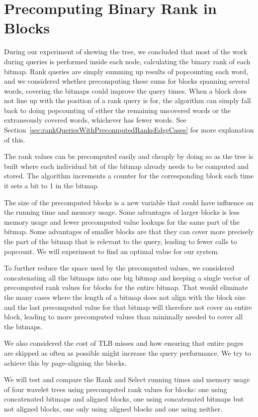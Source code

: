 \section{Precomputing Binary Rank in Blocks}
During our experiment of skewing the tree, we concluded that most of the work during queries is performed inside each node, calculating the binary rank of each bitmap.
Rank queries are simply summing up results of popcounting each word, and we considered whether precomputing these sums for blocks spanning several words, covering the bitmaps could improve the query times.
When a block does not line up with the position of a rank query is for, the algorithm can simply fall back to doing popcounting of either the remaining uncovered words or the extraneously covered words, whichever has fewer words.
See Section~\ref{sec:rankQueriesWithPrecomputedRanksEdgeCases} for more explanation of this.

The rank values can be precomputed easily and cheaply by doing so as the tree is built where each individual bit of the bitmap already needs to be computed and stored.
The algorithm increments a counter for the corresponding block each time it sets a bit to 1 in the bitmap.

The size of the precomputed blocks is a new variable that could have influence on the running time and memory usage.
Some advantages of larger blocks is less memory usage and fewer precomputed value lookups for the same part of the bitmap.
Some advantages of smaller blocks are that they can cover more precisely the part of the bitmap that is relevant to the query, leading to fewer calls to popcount.
We will experiment to find an optimal value for our system.

To further reduce the space used by the precomputed values, we considered concatenating all the bitmaps into one big bitmap and keeping a single vector of precomputed rank values for blocks for the entire bitmap. 
That would eliminate the many cases where the length of a bitmap does not align with the block size and the last precomputed value for that bitmap will therefore not cover an entire block, leading to more precomputed values than minimally needed to cover all the bitmaps.

We also considered the cost of TLB misses and how ensuring that entire pages are skipped as often as possible might increase the query performance. We try to achieve this by page-aligning the blocks.

We will test and compare the Rank and Select running times and memory usage of four wavelet trees using precomputed rank values for blocks: one using concatenated bitmaps and aligned blocks, one using concatenated bitmaps but not aligned blocks, one only using aligned blocks and one using neither.





